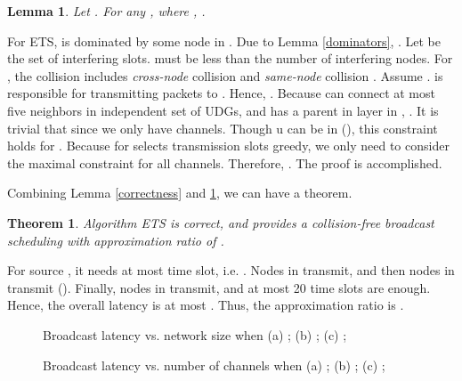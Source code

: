 \documentclass[10pt, conference]{IEEEtran}
\newtheorem{theorem}{Theorem}
\newtheorem{lemma}{Lemma}
\begin{document}
\begin{lemma} \label{connectors}
Let . For any ,  where , .
\end{lemma}
\begin{IEEEproof}
For ETS,  is dominated by some node in . Due to Lemma
\ref{dominators}, . Let  be
the set of interfering slots.  must be less than the
number of interfering nodes. For , the collision includes
\emph{cross-node} collision  and \emph{same-node}
collision . Assume .  is responsible
for transmitting packets to . Hence, . Because  can connect at most five
neighbors in independent set of UDGs, and  has a parent in
layer  in , . It is trivial that
 since we only have  channels. Though u
can be in  (), this constraint holds
for . Because  for  selects transmission slots greedy, we only need to
consider the maximal constraint for all channels. Therefore,
.
The proof is accomplished.
\end{IEEEproof}





Combining Lemma \ref{correctness} and
\ref{connectors}, we can have a theorem.
\begin{theorem} \label{ETS}
Algorithm ETS is correct, and provides a collision-free
broadcast scheduling with approximation ratio of .
\end{theorem}
\begin{IEEEproof}
For source , it needs at most  time slot, i.e. .
Nodes in  transmit, and then nodes in  transmit
(). Finally, nodes in  transmit, and at
most 20 time slots are enough.
Hence, the overall latency is at most . Thus,
the approximation ratio is .
\end{IEEEproof}




\begin{figure*}
\centering
{}
\caption{Broadcast latency vs. network size  when (a) ; (b) ; (c) ;}
\label{fig1} \end{figure*}

\begin{figure*}
\centering
{}
\caption{Broadcast latency vs. number of channels  when (a) ; (b) ; (c) ;}
\label{fig2} \end{figure*}
\end{document}
